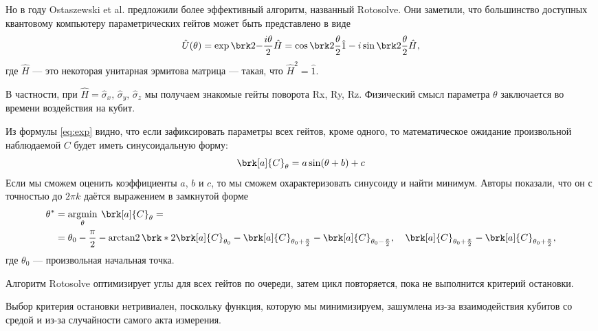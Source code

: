 Но в  году Ostaszewski et al. \cite{rotosolve} предложили более эффективный алгоритм, названный Rotosolve. Они заметили, что большинство доступных квантовому компьютеру параметрических гейтов может быть представлено в виде
\begin{equation}
\hat U(\theta) 
= \exp\brk2{-\frac{i \theta}{2} \hat H}
= \cos\brk2{\frac{\theta}{2}} \hat 1 - i \sin\brk2{\frac{\theta}{2}} \hat H,
\label{eq:exp}
\end{equation}
где $\hat H$ --- это некоторая унитарная эрмитова матрица --- такая, что $\hat H^2 = \hat 1.$

В частности, при 
$\hat H = \hat \sigma_x,\, \hat \sigma_y,\, \hat \sigma_z$
мы получаем знакомые гейты поворота Rx, Ry, Rz.
Физический смысл параметра $\theta$ заключается во времени воздействия на кубит.



Из формулы \eqref{eq:exp} видно, что если зафиксировать параметры всех гейтов, кроме одного, то математическое ожидание произвольной наблюдаемой $C$ будет иметь синусоидальную форму:
$$
\brk[a]{C}_\theta = a \sin(\theta + b) + c
$$
Если мы сможем оценить коэффициенты $a$, $b$ и $c$, то мы сможем охарактеризовать синусоиду и найти минимум. Авторы показали, что он с точностью до $2\pi k$ даётся выражением в замкнутой форме
\begin{align*}
\theta^* 
&= \argmin_\theta \: \brk[a]{C}_\theta = \\
&= \theta_0 - \frac{\pi}{2} - \arctantwo \brk*{
   2\brk[a]{C}_{\theta_0} - 
    \brk[a]{C}_{\theta_0 + \frac{\pi}{2}} - 
    \brk[a]{C}_{\theta_0 - \frac{\pi}{2}}
    ,\quad
    \brk[a]{C}_{\theta_0 + \frac{\pi}{2}} - 
    \brk[a]{C}_{\theta_0 + \frac{\pi}{2}}
},
\end{align*}
где $\theta_0$ --- произвольная начальная точка.

Алгоритм Rotosolve оптимизирует углы для всех гейтов по очереди, затем цикл повторяется, пока не выполнится критерий остановки. 


Выбор критерия остановки нетривиален, поскольку функция, которую мы минимизируем, зашумлена из-за взаимодействия кубитов со средой и из-за случайности самого акта измерения.

